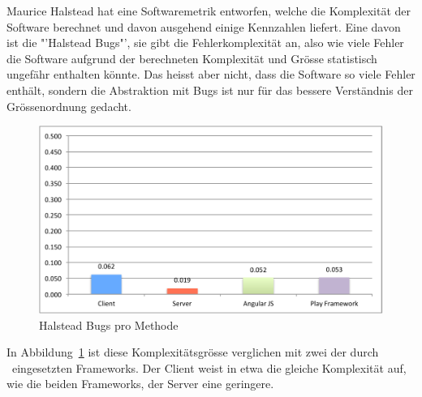 		Maurice Halstead hat eine Softwaremetrik entworfen,
		welche die Komplexität der Software berechnet und davon ausgehend einige Kennzahlen liefert.
		Eine davon ist die "'Halstead Bugs"', sie gibt die Fehlerkomplexität an,
		also wie viele Fehler die Software aufgrund der berechneten Komplexität und Grösse statistisch ungefähr enthalten könnte.
		Das heisst aber nicht, dass die Software so viele Fehler enthält,
		sondern die Abstraktion mit Bugs ist nur für das bessere Verständnis der Grössenordnung gedacht.
		\begin{figure}[H]
			\includegraphics[width=\textwidth]{projectPlan/media/img/halsteadBugsPerMethod.pdf}
			\centering
			\caption{Halstead Bugs pro Methode}
			\label{fig:halsteadBugsPerMethod}
		\end{figure}
		In Abbildung\ \ref{fig:halsteadBugsPerMethod} ist diese Komplexitätsgrösse verglichen mit zwei der durch \eeppi\ eingesetzten Frameworks.
		Der Client weist in etwa die gleiche Komplexität auf,
		wie die beiden Frameworks, der Server eine geringere.
